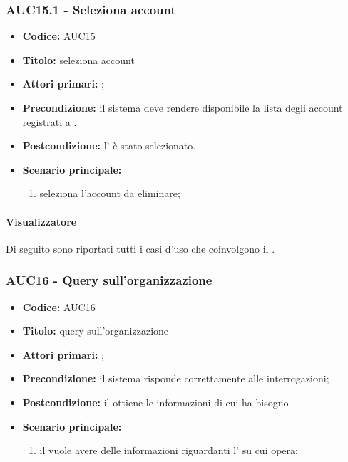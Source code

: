 \documentclass[casi-duso]{subfiles}
\begin{document}
\subsubsection{AUC15.1 - Seleziona account}
\label{subsub:AUC15}
\begin{itemize}
  \item \textbf{Codice:} AUC15
  \item \textbf{Titolo:} seleziona account
  \item \textbf{Attori primari:} ;
  \item \textbf{Precondizione:} il sistema deve rendere disponibile la lista degli account registrati a .
  \item \textbf{Postcondizione:} l' è stato selezionato.
  \item \textbf{Scenario principale:}
  \begin{enumerate}
    \item {} seleziona l'account da eliminare;
  \end{enumerate}
\end{itemize}

\paragraph{Visualizzatore}
Di seguito sono riportati tutti i casi d'uso che coinvolgono il  .

\subsubsection{AUC16 - Query sull'organizzazione}
\label{subsub:AUC16}
\begin{itemize}
  \item \textbf{Codice:} AUC16
  \item \textbf{Titolo:} query sull'organizzazione
  \item \textbf{Attori primari:} ;
  \item \textbf{Precondizione:} il sistema risponde correttamente alle interrogazioni;
  \item \textbf{Postcondizione:} il  ottiene le informazioni di cui ha bisogno.
  \item \textbf{Scenario principale:}
  \begin{enumerate}
    \item il  vuole avere delle informazioni riguardanti l' su cui opera;
  \end{enumerate}
\end{itemize}
\end{document}
